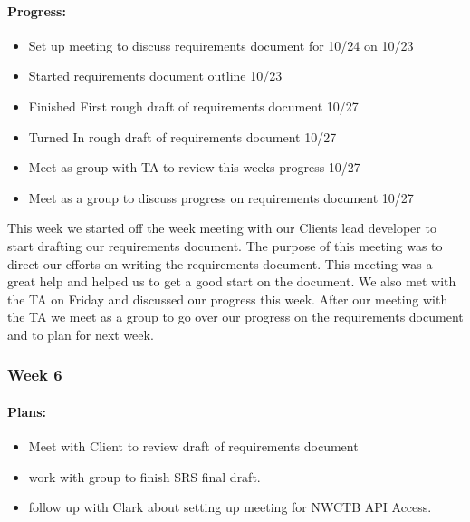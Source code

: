 \documentclass[onecolumn, draftclsnofoot,10pt, compsoc]{article}
\begin{document}
		    \paragraph{Progress:} \hfill \break
		    
		    \begin{itemize}
		        \item Set up meeting to discuss requirements document for 10/24 on 10/23
		        \item Started requirements document outline 10/23
		        \item Finished First rough draft of requirements document 10/27
		        \item Turned In rough draft of requirements document 10/27
		        \item Meet as group with TA to review this weeks progress 10/27
		        \item Meet as a group to discuss progress on requirements document 10/27
		    \end{itemize}
		    
		        
		        This week we started off the week meeting with our Clients lead developer to start drafting our requirements document. The purpose of this meeting was to direct our efforts on writing the requirements document. This meeting was a great help and helped us to get a good start on the document.  We also met with the TA on Friday and discussed our progress this week. After our meeting with the TA we meet as a group to go over our progress on the requirements document and to plan for next week.\\
		
		\subsubsection{Week 6}
		
		    \paragraph{Plans:} \hfill \break
		        
		        \begin{itemize}
		            \item Meet with Client to review draft of requirements document
		            \item work with group to finish SRS final draft.
		            \item follow up with Clark about setting up meeting for NWCTB API Access.
		        \end{itemize}
		
\end{document}
